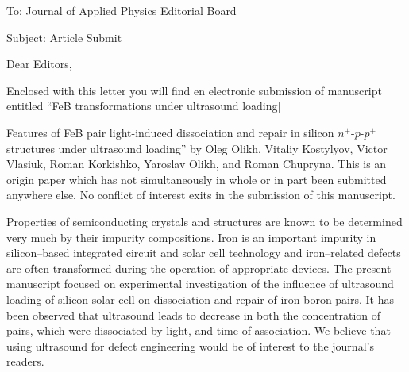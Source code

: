\documentclass[preprint]{elsarticle}
\begin{document}
To:
Journal of Applied Physics Editorial Board


Subject:
Article Submit

\vspace{5mm}
Dear Editors,

\vspace{3mm}
Enclosed with this letter you will find en electronic submission of manuscript entitled ``FeB transformations under ultrasound loading]{Features of FeB pair light-induced dissociation and repair in silicon $n^+$-$p$-$p^+$ structures under ultrasound loading'' by Oleg Olikh, Vitaliy Kostylyov, 
Victor Vlasiuk, Roman Korkishko, Yaroslav Olikh, and Roman Chupryna.
This is an origin paper which has not
simultaneously in whole or in part been submitted anywhere else.
No conflict of interest exits in the submission of this manuscript.

Properties of semiconducting crystals and structures are known to be determined very much by their impurity compositions.
Iron is an important impurity in silicon--based integrated circuit and solar cell technology
and iron--related defects are often transformed during the operation of appropriate devices. 
The present manuscript focused on experimental investigation of the influence of ultrasound loading of silicon solar cell on dissociation and repair of iron-boron pairs.
It has been observed that ultrasound leads to decrease in both the concentration of pairs, which were dissociated by light, and time of association.
We believe that using ultrasound for defect engineering would be of interest to the journal’s readers.





}
\end{document}
